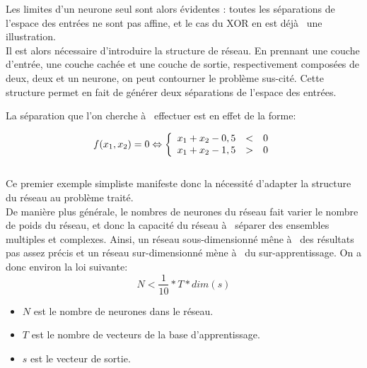 \documentclass[a4paper,twoside]{report}
\begin{document}
                Les limites d'un neurone seul sont alors évidentes : toutes les séparations de l'espace des entrées ne sont pas affine, et le cas du XOR en est déjà  une illustration.\\

                Il est alors nécessaire d'introduire la structure de réseau. En prennant une couche d'entrée, une couche cachée et une couche de sortie, respectivement composées de deux, deux et un neurone, on peut contourner le problème sus-cité. Cette structure permet en fait de générer deux séparations de l'espace des entrées.

                La séparation que l'on cherche à  effectuer est en effet de la forme:

                \begin{equation}
                    f(x_{1},x_{2})=0 \Leftrightarrow
                    \left\{
                        \begin{array}{r c l}
                        x_{1}+x_{2}-0,5 &<& 0\\
                        x_{1}+x_{2}-1,5 &>& 0
                        \end{array}
                    \right.
                \end{equation}\\

                Ce premier exemple simpliste manifeste donc la nécessité d'adapter la structure du réseau au problème traité.\\

                De manière plus générale, le nombres de neurones du réseau fait varier le nombre de poids du réseau, et donc la capacité du réseau à  séparer des ensembles multiples et complexes. Ainsi, un réseau sous-dimensionné mêne à  des résultats pas assez précis et un réseau sur-dimensionné mène à  du sur-apprentissage. On a donc environ la loi suivante:
                \begin{equation}
                    N<\frac{1}{10}*T*dim(s)
                \end{equation}
                \begin{itemize}
                    \item $N$ est le nombre de neurones dans le réseau.
                    \item $T$ est le nombre de vecteurs de la base d'apprentissage.
                    \item $s$ est le vecteur de sortie.
                \end{itemize}
\end{document}
